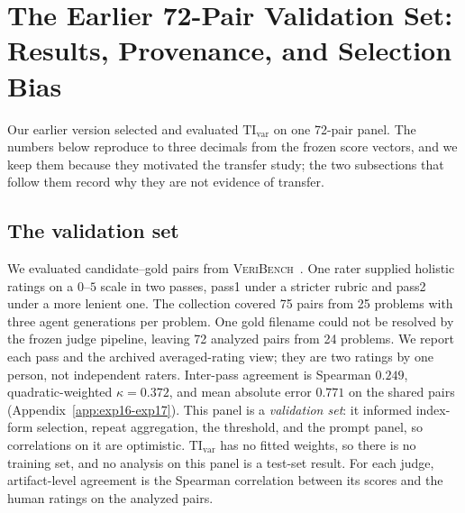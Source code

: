 \section{The Earlier 72-Pair Validation Set: Results, Provenance, and Selection Bias}\label{app:validation-set-72}
Our earlier version selected and evaluated $\mathrm{TI}_{\mathrm{var}}$ on one 72-pair panel.
The numbers below reproduce to three decimals from the frozen score vectors, and we keep them because they motivated the transfer study; the two subsections that follow them record why they are not evidence of transfer.

\subsection{The validation set}\label{sec:data-human-protocol}\label{sec:veribench-overview}
We evaluated candidate--gold pairs from \textsc{VeriBench}~\citep{miranda2026veribench}.
One rater supplied holistic ratings on a $0$--$5$ scale in two passes, pass1 under a stricter rubric and pass2 under a more lenient one.
The collection covered 75 pairs from 25 problems with three agent generations per problem.
One gold filename could not be resolved by the frozen judge pipeline, leaving 72 analyzed pairs from 24 problems.
We report each pass and the archived averaged-rating view; they are two ratings by one person, not independent raters.
Inter-pass agreement is Spearman $0.249$, quadratic-weighted $\kappa=0.372$, and mean absolute error $0.771$ on the shared pairs (Appendix~\ref{app:exp16-exp17}).
This panel is a \emph{validation set}: it informed index-form selection, repeat aggregation, the threshold, and the prompt panel, so correlations on it are optimistic.
$\mathrm{TI}_{\mathrm{var}}$ has no fitted weights, so there is no training set, and no analysis on this panel is a test-set result.
For each judge, artifact-level agreement is the Spearman correlation between its scores and the human ratings on the analyzed pairs.

